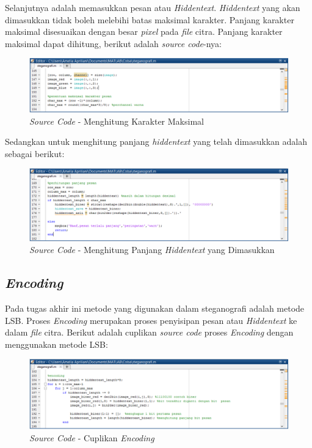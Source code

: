 Selanjutnya adalah memasukkan pesan atau \emph{Hiddentext}. \emph{Hiddentext} yang akan dimasukkan tidak boleh melebihi batas maksimal karakter. Panjang karakter maksimal disesuaikan dengan besar \emph{pixel} pada \emph{file} citra. Panjang karakter maksimal dapat dihitung, berikut adalah \emph{source code}-nya:
	\begin{figure}[H]
		\centering
		\includegraphics[width=1\textwidth]{gambar/source_code/karakter_maksimal}
		\caption{\emph{Source Code} - Menghitung Karakter Maksimal}
		\label{karakter_max}
	\end{figure}

Sedangkan untuk menghitung panjang \emph{hiddentext} yang telah dimasukkan adalah sebagai berikut:
	\begin{figure}[H]
		\centering
		\includegraphics[width=1\textwidth]{gambar/source_code/panjang_pesan}
		\caption{\emph{Source Code} - Menghitung Panjang \emph{Hiddentext} yang Dimasukkan}
		\label{panjang_pesan}
	\end{figure}

\subsection{\emph{Encoding}}
Pada tugas akhir ini metode yang digunakan dalam steganografi adalah metode LSB. Proses \emph{Encoding} merupakan proses penyisipan pesan atau \emph{Hiddentext} ke dalam \emph{file} citra. Berikut adalah cuplikan \emph{source code} proses \emph{Encoding} dengan menggunakan metode LSB:
	\begin{figure}[H]
		\centering
		\includegraphics[width=1\textwidth]{gambar/source_code/cuplikan_encoding}
		\caption{\emph{Source Code} - Cuplikan \emph{Encoding}}
		\label{cuplikan_encoding}
	\end{figure}

